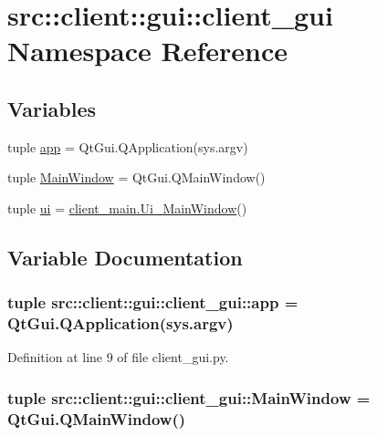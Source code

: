 \hypertarget{namespacesrc_1_1client_1_1gui_1_1client__gui}{
\section{src::client::gui::client\_\-gui Namespace Reference}
\label{namespacesrc_1_1client_1_1gui_1_1client__gui}
}
\subsection*{Variables}
\begin{DoxyCompactItemize}
\item 
tuple \hyperlink{namespacesrc_1_1client_1_1gui_1_1client__gui_a3414abf95a47d6fe007b8dbb48e97d84}{app} = QtGui.QApplication(sys.argv)
\item 
tuple \hyperlink{namespacesrc_1_1client_1_1gui_1_1client__gui_a57386f6475c7c2a378fa41fbe75d8487}{MainWindow} = QtGui.QMainWindow()
\item 
tuple \hyperlink{namespacesrc_1_1client_1_1gui_1_1client__gui_a4f6573094992de7d77ef40f18b7d7567}{ui} = \hyperlink{classsrc_1_1client_1_1gui_1_1client__main_1_1Ui__MainWindow}{client\_\-main.Ui\_\-MainWindow}()
\end{DoxyCompactItemize}


\subsection{Variable Documentation}
\hypertarget{namespacesrc_1_1client_1_1gui_1_1client__gui_a3414abf95a47d6fe007b8dbb48e97d84}{
\subsubsection[{app}]{\setlength{\rightskip}{0pt plus 5cm}tuple {\bf src::client::gui::client\_\-gui::app} = QtGui.QApplication(sys.argv)}}
\label{namespacesrc_1_1client_1_1gui_1_1client__gui_a3414abf95a47d6fe007b8dbb48e97d84}


Definition at line 9 of file client\_\-gui.py.

\hypertarget{namespacesrc_1_1client_1_1gui_1_1client__gui_a57386f6475c7c2a378fa41fbe75d8487}{
\subsubsection[{MainWindow}]{\setlength{\rightskip}{0pt plus 5cm}tuple {\bf src::client::gui::client\_\-gui::MainWindow} = QtGui.QMainWindow()}}
\label{namespacesrc_1_1client_1_1gui_1_1client__gui_a57386f6475c7c2a378fa41fbe75d8487}


